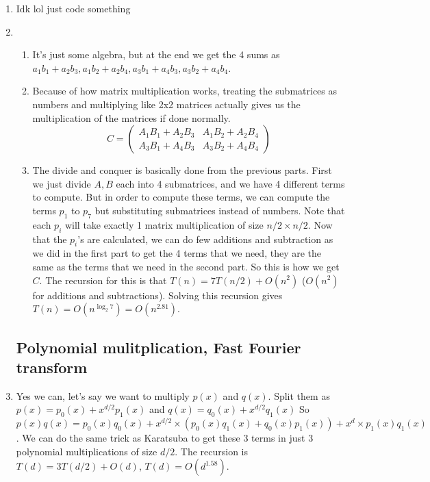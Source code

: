\documentclass[12pt]{report}
\begin{document}
\begin{enumerate}[label=\textbf{\arabic*.}]
    \item Idk lol just code something
    
    \item
    \begin{enumerate}[label=\textbf{(\alph*)}]
        \item It's just some algebra, but at the end we get the 4 sums as $a_1 b_1 + a_2 b_3, a_1 b_2 + a_2 b_4, a_3 b_1 + a_4 b_3, a_3 b_2 + a_4 b_4$.
        \item Because of how matrix multiplication works, treating the submatrices as numbers and multiplying like 2x2 matrices actually gives us 
        the multiplication of the matrices if done normally.
        \begin{equation*}
            C = 
            \begin{pmatrix}
                A_1 B_1 + A_2 B_3 & A_1 B_2 + A_2 B_4 \\
                A_3 B_1 + A_4 B_3 & A_3 B_2 + A_4 B_4
            \end{pmatrix}
        \end{equation*}
        \item The divide and conquer is basically done from the previous parts. First we just divide $A, B$ each into 4 submatrices, and we have 4 
        different terms to compute. But in order to compute these terms, we can compute the terms $p_1$ to $p_7$ but substituting submatrices instead
        of numbers. Note that each $p_i$ will take exactly 1 matrix multiplication of size $n/2 \times n/2$. Now that the $p_i$'s are calculated, we
        can do few additions and subtraction as we did in the first part to get the 4 terms that we need, they are the same as the terms that we need
        in the second part. So this is how we get $C$. The recursion for this is that $T(n) = 7T(n/2) + O(n^2)$ ($O(n^2)$ for additions and subtractions).
        Solving this recursion gives $T(n) = O(n^{\log_2 7}) = O(n^{2.81})$.
    \end{enumerate}

    \subsection*{\Large\bfseries Polynomial mulitplication, Fast Fourier transform}

    \item Yes we can, let's say we want to multiply $p(x)$ and $q(x)$. Split them as $p(x) = p_0(x) + x^{d/2}p_1(x)$ and $q(x) = q_0(x) + x^{d/2}q_1(x)$
    So $p(x)q(x) = p_0(x)q_0(x) + x^{d/2} \times (p_0(x)q_1(x) + q_0(x)p_1(x)) + x^d \times p_1(x)q_1(x)$. We can do the same trick as Karatsuba to get
    these 3 terms in just 3 polynomial multiplications of size $d/2$. The recursion is $T(d) = 3T(d/2) + O(d)$, $T(d) = O(d^{1.58})$.


\end{enumerate}
\end{document}
